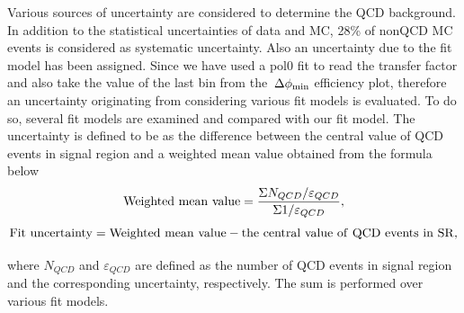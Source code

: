 Various sources of uncertainty are considered to determine the QCD background. 
In addition to the statistical uncertainties of data and MC, 28\% of 
nonQCD MC events is considered as systematic uncertainty.
Also an uncertainty due to the fit model has been assigned. Since we have used a pol0 fit 
to read the transfer factor and also take the value of the last bin from the $\,{\Delta\phi_{\rm min}}$ efficiency plot,
therefore an uncertainty originating from considering various fit models is evaluated. To do so, several 
fit models are examined and compared with our fit model. The uncertainty is defined to be as the 
difference between the central value of QCD events in signal region and a weighted mean value obtained from the formula below 
\begin{equation}
{\rm Weighted~mean~value} =\frac{\Sigma N_{QCD}/\varepsilon_{QCD}}{\Sigma 1/\varepsilon_{QCD}},
\end{equation}
\begin{equation}
{\rm Fit~uncertainty} ={\rm Weighted~mean~value}-{\rm the~central~value~of~QCD~events~in~SR},
\end{equation}

where $N_{QCD}$ and $\varepsilon_{QCD}$ are defined as the number of QCD events in signal region and 
the corresponding uncertainty, respectively. The sum is performed over various fit models.\\ 


